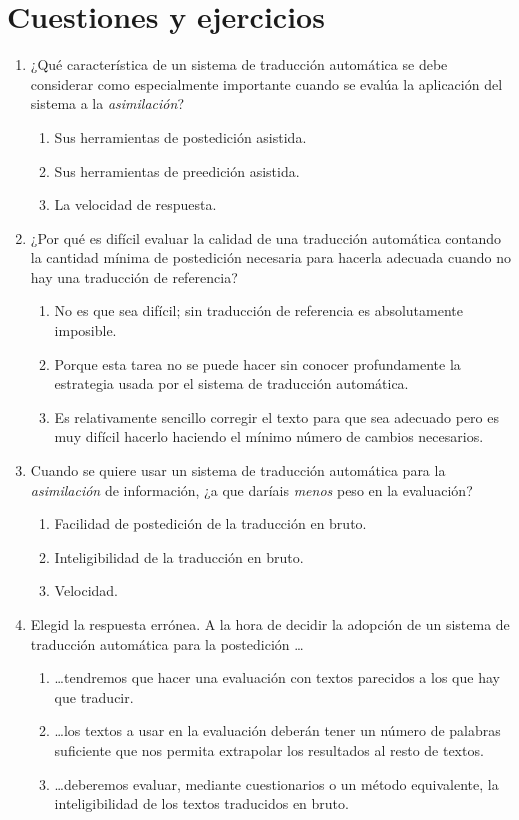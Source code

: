 \section{Cuestiones y ejercicios} 

\begin{enumerate} \item ¿Qué característica de un sistema de traducción automática se debe considerar como especialmente importante cuando se evalúa la aplicación del sistema a la \emph{asimilación}? \begin{enumerate} \item Sus herramientas de postedición asistida. \item Sus herramientas de preedición asistida. \item La velocidad de respuesta. \end{enumerate} 

\item ¿Por qué es difícil evaluar la calidad de una traducción automática contando la cantidad mínima de postedición necesaria para hacerla adecuada cuando no hay una traducción de referencia? \begin{enumerate} \item No es que sea difícil; sin traducción de referencia es absolutamente imposible. \item Porque esta tarea no se puede hacer sin conocer profundamente la estrategia usada por el sistema de traducción automática. \item Es relativamente sencillo corregir el texto para que sea adecuado pero es muy difícil hacerlo haciendo el mínimo número de cambios necesarios. \end{enumerate} 

\item Cuando se quiere usar un sistema de traducción automática para la \emph{asimilación} de información, ¿a que daríais \emph{menos} peso en la evaluación? \begin{enumerate} \item Facilidad de postedición de la traducción en bruto. \item Inteligibilidad de la traducción en bruto. \item Velocidad. \end{enumerate} 

\item Elegid la respuesta errónea. A la hora de decidir la adopción de un sistema de traducción automática para la postedición \ldots\begin{enumerate} \item \ldots tendremos que hacer una evaluación con textos parecidos a los que hay que traducir. \item \ldots los textos a usar en la evaluación deberán tener un número de palabras suficiente que nos permita extrapolar los resultados al resto de textos. \item \ldots deberemos evaluar, mediante cuestionarios o un método equivalente, la inteligibilidad de los textos traducidos en bruto. \end{enumerate} 


\end{enumerate}
